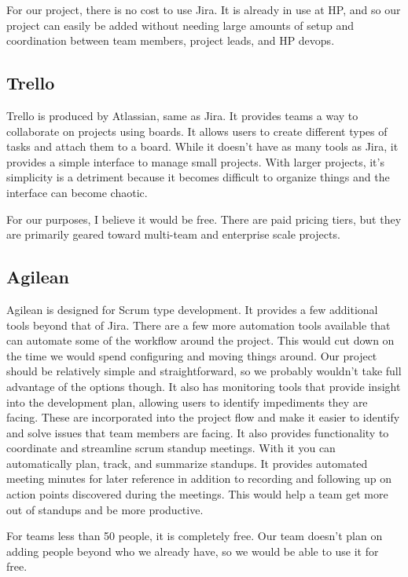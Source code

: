 \documentclass[onecolumn, draftclsnofoot,10pt, compsoc]{IEEEtran}
\begin{document}
For our project, there is no cost to use Jira.
It is already in use at HP, and so our project can easily be added without needing large amounts of setup and coordination between team members, project leads, and HP devops.

\subsection{Trello}
Trello is produced by Atlassian, same as Jira.
It provides teams a way to collaborate on projects using boards.
It allows users to create different types of tasks and attach them to a board.
While it doesn’t have as many tools as Jira, it provides a simple interface to manage small projects.
With larger projects, it’s simplicity is a detriment because it becomes difficult to organize things and the interface can become chaotic.

For our purposes, I believe it would be free.
There are paid pricing tiers, but they are primarily geared toward multi-team and enterprise scale projects.

\subsection{Agilean}
Agilean is designed for Scrum type development.
It provides a few additional tools beyond that of Jira.
There are a few more automation tools available that can automate some of the workflow around the project.
This would cut down on the time we would spend configuring and moving things around.
Our project should be relatively simple and straightforward, so we probably wouldn’t take full advantage of the options though.
It also has monitoring tools that provide insight into the development plan, allowing users to identify impediments they are facing.
These are incorporated into the project flow and make it easier to identify and solve issues that team members are facing.
It also provides functionality to coordinate and streamline scrum standup meetings.
With it you can automatically plan, track, and summarize standups.
It provides automated meeting minutes for later reference in addition to recording and following up on action points discovered during the meetings.  This would help a team get more out of standups and be more productive.

For teams less than 50 people, it is completely free.
Our team doesn’t plan on adding people beyond who we already have, so we would be able to use it for free.
\end{document}
